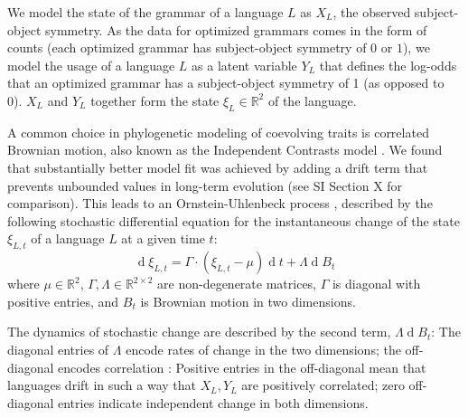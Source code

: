 \documentclass[11pt,a4paper]{article}
\begin{document}
We model the state of the grammar of a language $L$ as $X_L$, the observed subject-object symmetry.
As the data for optimized grammars comes in the form of counts (each optimized grammar has subject-object symmetry of $0$ or $1$), we model the usage of a language $L$ as a latent variable $Y_L$ that defines the log-odds that an optimized grammar has a subject-object symmetry of 1 (as opposed to 0).
$X_L$ and $Y_L$ together form the state $\xi_L \in \mathbb{R}^2$  of the language.



A common choice in phylogenetic modeling of coevolving traits is correlated Brownian motion, also known as the Independent Contrasts model \citep{felsenstein1973maximum,freckleton2012fast}.
We found that substantially better model fit was achieved by adding a drift term that prevents unbounded values  in long-term evolution (see SI Section X for comparison).
This leads to an Ornstein-Uhlenbeck process \citep{blackwell2003bayesian}, described by the following stochastic differential equation for the instantaneous change of the state $\xi_{L,t}$ of a language $L$ at a given time $t$:
\begin{equation*}
    \operatorname{d}\xi_{L,t} = \Gamma \cdot (\xi_{L,t}-\mu) \operatorname{d}t + \Lambda \operatorname{d}B_t
\end{equation*}
where $\mu \in \mathbb{R}^2$,  $\Gamma, \Lambda \in \mathbb{R}^{2\times 2}$ are non-degenerate matrices, $\Gamma$ is diagonal with positive entries, and $B_t$ is Brownian motion in two dimensions.

The dynamics of stochastic change are described by the second term, $\Lambda \operatorname{d}B_t$:
The diagonal entries of $\Lambda$ encode rates of change in the two dimensions; the off-diagonal encodes correlation \citep{felsenstein1973maximum,freckleton2012fast}: Positive entries in the off-diagonal mean that languages drift in such a way that $X_L, Y_L$ are positively correlated; zero off-diagonal entries indicate independent change in both dimensions.
\end{document}
